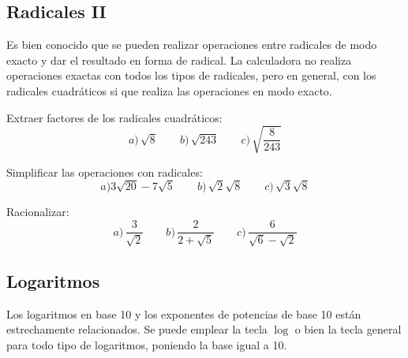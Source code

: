 \documentclass[12pt]{article}
\newenvironment{capitulo}{\begin{tcolorbox}[colback=blue!5!white,colframe=red!75!black]}{\end{tcolorbox}\bigskip}
\newenvironment{ejer}{\begin{tcolorbox}[center title, 
fonttitle=\sffamily\bfseries,colback=blue!5,colframe=orange]}{\end{tcolorbox}}
\begin{document}
\newpage

\begin{capitulo}
\section*{Radicales II}
\end{capitulo}

Es bien conocido que se pueden realizar operaciones entre radicales de modo exacto y dar el resultado en forma de radical. La calculadora no realiza operaciones exactas con todos los tipos de radicales, pero en general, con los radicales cuadráticos si que realiza las operaciones en modo exacto.



\begin{ejer} 

Extraer factores de los radicales cuadráticos:
\[
a)\,\sqrt{8}  \qquad b) \,  \sqrt{243} \qquad c)\, \sqrt{\frac{8}{243}}
\]

\end{ejer}


\begin{ejer} 

Simplificar las operaciones con radicales:
\[
a)3\sqrt{20}- 7\sqrt{5} \qquad b)\, \sqrt{2}\sqrt{8} \qquad c)\, \sqrt{3}\sqrt{8}
\]

\end{ejer}

\begin{ejer} 

Racionalizar:
\[
a)\, \frac{3}{\sqrt{2}} \qquad b)\, \frac{2}{2+\sqrt{5}} \qquad c) \, \frac{6}{\sqrt{6}-\sqrt{2}}
\]

\end{ejer}



\newpage

\begin{capitulo}
\section*{Logaritmos}
\end{capitulo}

Los logaritmos en base 10 y los exponentes de potencias de base 10 están estrechamente relacionados. Se puede emplear la tecla $\log$ o bien la tecla general para todo tipo de logaritmos, poniendo la base igual a 10.
\end{document}
